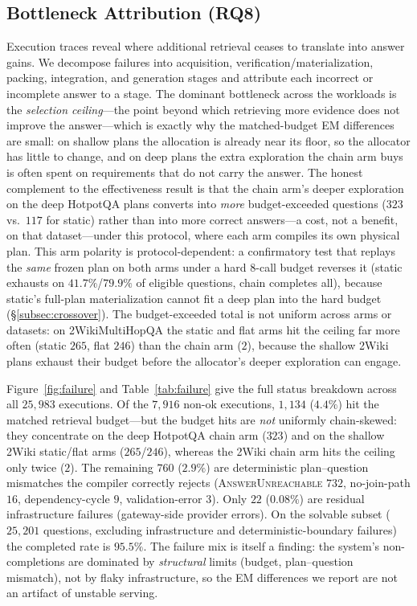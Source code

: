\subsection{Bottleneck Attribution (RQ8)}
Execution traces reveal where additional retrieval ceases to translate into
answer gains. We decompose failures into acquisition, verification/materialization,
packing, integration, and generation stages and attribute each incorrect or
incomplete answer to a stage. The dominant bottleneck across the workloads is
the \emph{selection ceiling}---the point beyond which retrieving more evidence
does not improve the answer---which is exactly why the matched-budget EM
differences are small: on shallow plans the allocation is already near its
floor, so the allocator has little to change, and on deep plans the extra
exploration the chain arm buys is often spent on requirements that do not
carry the answer. The honest complement to the effectiveness result is that the chain arm's
deeper exploration on the deep HotpotQA plans converts into \emph{more}
budget-exceeded questions ($323$ vs.\ $117$ for static) rather than into more
correct answers---a cost, not a benefit, on that dataset---under this
protocol, where each arm compiles its own physical plan. This arm polarity is
protocol-dependent: a confirmatory test that replays the \emph{same} frozen
plan on both arms under a hard $8$-call budget reverses it (static exhausts on
$41.7\%$/$79.9\%$ of eligible questions, chain completes all), because static's
full-plan materialization cannot fit a deep plan into the hard budget
(\S\ref{subsec:crossover}). The budget-exceeded
total is not uniform across arms or datasets: on 2WikiMultiHopQA the static and
flat arms hit the ceiling far more often (static $265$, flat $246$) than the
chain arm ($2$), because the shallow 2Wiki plans exhaust their budget before
the allocator's deeper exploration can engage.

Figure~\ref{fig:failure} and Table~\ref{tab:failure} give the full status
breakdown across all $25{,}983$ executions. Of the $7{,}916$ non-ok executions,
$1{,}134$ ($4.4\%$) hit the matched retrieval budget---but the budget hits are
\emph{not} uniformly chain-skewed: they concentrate on the deep HotpotQA chain
arm ($323$) and on the shallow 2Wiki static/flat arms ($265$/$246$), whereas the
2Wiki chain arm hits the ceiling only twice ($2$). The remaining $760$ ($2.9\%$)
are deterministic
plan--question mismatches the compiler correctly rejects
(\textsc{AnswerUnreachable} $732$, no-join-path $16$, dependency-cycle $9$,
validation-error $3$). Only $22$ ($0.08\%$) are residual infrastructure
failures (gateway-side provider errors). On the solvable subset ($25{,}201$
questions, excluding infrastructure and deterministic-boundary failures) the
completed rate is $95.5\%$. The failure mix is itself a finding: the system's
non-completions are dominated by \emph{structural} limits (budget, plan--question
mismatch), not by flaky infrastructure, so the EM differences we report are not
an artifact of unstable serving.

